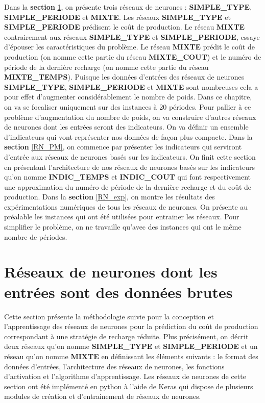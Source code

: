 Dans la \textbf{section} \ref{seq_funct}, on présente trois réseaux de neurones : \textbf{SIMPLE\_TYPE}, \textbf{SIMPLE\_PERIODE} et \textbf{MIXTE}.
 Les réseaux \textbf{SIMPLE\_TYPE} et \textbf{SIMPLE\_PERIODE} prédisent le coût de production.
 Le réseau \textbf{MIXTE} contrairement aux réseaux \textbf{SIMPLE\_TYPE} et \textbf{SIMPLE\_PERIODE}, essaye d'épouser les caractéristiques du problème. Le réseau \textbf{MIXTE} prédit le coût de production (on nomme cette partie du réseau \textbf{MIXTE\_COUT}) et le numéro de période de la dernière recharge (on nomme cette partie du réseau \textbf{MIXTE\_TEMPS}). Puisque les données d'entrées des réseaux de neurones \textbf{SIMPLE\_TYPE}, \textbf{SIMPLE\_PERIODE} et \textbf{MIXTE} sont nombreuses cela a pour effet d'augmenter considérablement le nombre de poids. Dans ce chapitre, on va se focaliser uniquement sur des instances à 20 périodes. Pour pallier à ce problème d'augmentation du nombre de poids, on va construire d'autres réseaux de neurones dont les entrées seront des indicateurs. On va définir un ensemble d'indicateurs qui vont représenter nos données de façon plus compacte.
Dans la \textbf{section} \ref{RN_PM}, on commence par présenter les indicateurs qui serviront d'entrée aux réseaux de neurones basés sur les indicateurs. On finit cette section en présentant l'architecture de nos réseaux de neurones basés sur les indicateurs qu'on nomme \textbf{INDIC\_TEMPS} et \textbf{INDIC\_COUT} qui font respectivement une approximation  du numéro de période de la dernière recharge et du coût de production. Dans la \textbf{section} \ref{RN_exp}, on montre les résultats des expérimentations numériques de tous les réseaux de neurones. On présente au préalable les instances qui ont été utilisées pour entrainer les réseaux. Pour simplifier le problème, on ne travaille qu'avec des instances qui ont le même nombre de périodes.

\section{Réseaux de neurones dont les entrées sont des données brutes}
\label{seq_funct}

Cette section présente la méthodologie suivie pour la conception et l'apprentissage des réseaux de neurones pour la prédiction du coût de production correspondant à une stratégie de recharge réduite. Plus précisément, on décrit deux réseaux qu'on nomme \textbf{SIMPLE\_TYPE} et \textbf{SIMPLE\_PERIODE} et un réseau qu'on nomme \textbf{MIXTE} en définissant les éléments suivants : le format des données d'entrées, l'architecture des réseaux de neurones, les fonctions d'activation et l'algorithme d'apprentissage. Les réseaux de neurones de cette section ont été implémenté en python à l'aide de Keras qui dispose de plusieurs modules de création et d'entrainement de réseaux de neurones.

